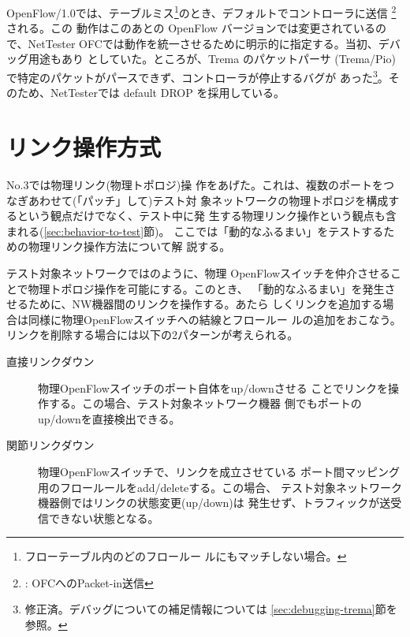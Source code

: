 OpenFlow/1.0では、テーブルミス\footnote{フローテーブル内のどのフロールー
ルにもマッチしない場合。}のとき、デフォルトでコントローラに送信
\footnote{ : OFCへのPacket-in送信}される。この
動作はこのあとの OpenFlow バージョンでは変更されているので、NetTester
OFCでは動作を統一させるために明示的に指定する。当初、デバッグ用途もあり
としていた。ところが、Trema のパケットパーサ
(Trema/Pio)で特定のパケットがパースできず、コントローラが停止するバグが
あった\footnote{修正済。デバッグについての補足情報については
\ref{sec:debugging-trema}節を参照。}。そのため、NetTesterでは default
DROP を採用している。

  \section{リンク操作方式}
  \label{sec:link-operation}



 No.3では物理リンク(物理トポロジ)操
作をあげた。これは、複数のポートをつなぎあわせて(「パッチ」して)テスト対
象ネットワークの物理トポロジを構成するという観点だけでなく、テスト中に発
生する物理リンク操作という観点も含まれる(\ref{sec:behavior-to-test}節)。
ここでは「動的なふるまい」をテストするための物理リンク操作方法について解
説する。

テスト対象ネットワークではのように、物理
OpenFlowスイッチを仲介させることで物理トポロジ操作を可能にする。このとき、
「動的なふるまい」を発生させるために、NW機器間のリンクを操作する。あたら
しくリンクを追加する場合は同様に物理OpenFlowスイッチへの結線とフロールー
ルの追加をおこなう。リンクを削除する場合には以下の2パターンが考えられる。
\begin{description}
 \item[直接リンクダウン] 物理OpenFlowスイッチのポート自体をup/downさせる
            ことでリンクを操作する。この場合、テスト対象ネットワーク機器
            側でもポートのup/downを直接検出できる。
 \item[関節リンクダウン] 物理OpenFlowスイッチで、リンクを成立させている
            ポート間マッピング用のフロールールをadd/deleteする。この場合、
            テスト対象ネットワーク機器側ではリンクの状態変更(up/down)は
            発生せず、トラフィックが送受信できない状態となる。
\end{description}

